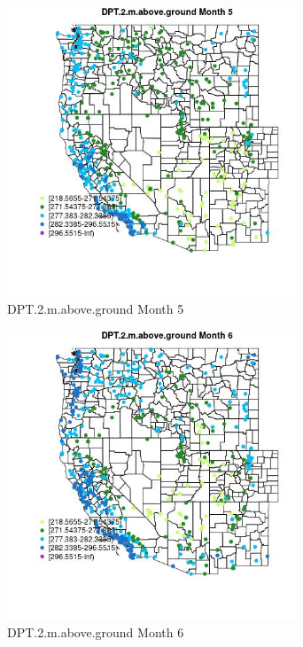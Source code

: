 \begin{figure} 
\centering  
\includegraphics[width=0.77\textwidth]{Code_Outputs/Report_ML_input_PM25_Step4_part_e_de_duplicated_aves_compiled_2019-05-14wNAs_MapObsMo5DPT2maboveground.jpg} 
\caption{\label{fig:Report_ML_input_PM25_Step4_part_e_de_duplicated_aves_compiled_2019-05-14wNAsMapObsMo5DPT2maboveground}DPT.2.m.above.ground Month 5} 
\end{figure} 
 

\begin{figure} 
\centering  
\includegraphics[width=0.77\textwidth]{Code_Outputs/Report_ML_input_PM25_Step4_part_e_de_duplicated_aves_compiled_2019-05-14wNAs_MapObsMo6DPT2maboveground.jpg} 
\caption{\label{fig:Report_ML_input_PM25_Step4_part_e_de_duplicated_aves_compiled_2019-05-14wNAsMapObsMo6DPT2maboveground}DPT.2.m.above.ground Month 6} 
\end{figure} 
 

